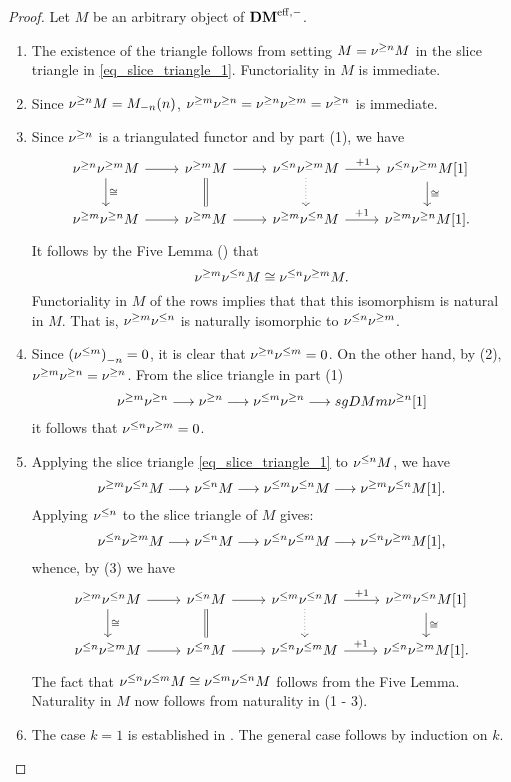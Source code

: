 \begin{proof}
Let $M$ be an arbitrary object of $\DMeff$.

\begin{enumerate}
\item The existence of the triangle follows from setting $M = 
\sgDM{n} M$ in the slice triangle in \eqref{eq_slice_triangle_1}. 
Functoriality in $M$ is immediate.

\item Since $\sgDM{n}M = \tZ[n]{\hZ[n]{M}}$, $\sgDM{m}\sgDM{n} = 
\sgDM{n}\sgDM{m} = \sgDM{n}$ is immediate.

\item Since $\sgDM{n}$ is a triangulated functor and by part (1),
we have
\[
\begin{tikzcd}
\sgDM{n} \sgDM{m} M \arrow{r} \arrow{d}{\cong} &
\sgDM{m} M \arrow{r} \arrow[equals]{d} &
\slDM{n} \sgDM{m} M \arrow{r}{+1} \arrow[dotted]{d} &
\slDM{n} \sgDM{m} M[1] \arrow{d}{\cong}\\
\sgDM{m} \sgDM{n} M \arrow{r} &
\sgDM{m} M \arrow{r} &
\sgDM{m} \slDM{n} M \arrow{r}{+1} &
\sgDM{m} \sgDM{n} M[1].
\end{tikzcd}
\]
It follows by the Five Lemma (\cite[10.2.2]{WH}) that 
\[
\sgDM{m}\slDM{n} M \cong \slDM{n}\sgDM{m} M.
\]
Functoriality in $M$ of the rows implies that that this 
isomorphism is natural in $M$. That is, $\sgDM{m} \slDM{n}$ is 
naturally isomorphic to $\slDM{n} \sgDM{m}$.

\item Since $\hZ[n]{(\slDM{m})} = 0$, it is clear that
$\sgDM{n}\slDM{m} = 0$. On the other hand, by (2), $\sgDM{m}\sgDM{n}
= \sgDM{n}$. From the slice triangle in part (1)
\[
\sgDM{m} \sgDM{n} \to \sgDM{n} \to \slDM{m} \sgDM{n} \to sgDM{m} 
   \sgDM{n}[1]
\]
it follows that $\slDM{n} \sgDM{m} = 0$.

\item Applying the slice triangle \eqref{eq_slice_triangle_1} to
$\slDM{n} M$, we have
\[
\sgDM{m} \slDM{n} M \to \slDM{n} M \to \slDM{m} \slDM{n} M \to
\sgDM{m} \slDM{n} M[1].
\]
Applying $\slDM{n}$ to the slice triangle of $M$ gives:
\[
\slDM{n} \sgDM{m} M \to \slDM{n} M \to \slDM{n} \slDM{m} M \to
\slDM{n} \sgDM{m} M[1],
\]
whence, by (3) we have
\[
\begin{tikzcd}
\sgDM{m} \slDM{n} M \arrow{r} \arrow{d}{\cong} &
\slDM{n} M \arrow{r} \arrow[equals]{d} &
\slDM{m} \slDM{n} M \arrow{r}{+1} \arrow[dotted]{d} &
\sgDM{m} \slDM{n} M[1] \arrow{d}{\cong}\\
\slDM{n} \sgDM{m} M \arrow{r} &
\slDM{n} M \arrow{r} &
\slDM{n} \slDM{m} M \arrow{r}{+1} &
\slDM{n} \sgDM{m} M[1].
\end{tikzcd}
\]
The fact that $\slDM{n} \slDM{m} M \cong \slDM{m} \slDM{n} M$
follows from the Five Lemma. Naturality in $M$ now follows from
naturality in (1 - 3).

\item The case $k = 1$ is established in \cite[Cor. 1.4]{HuKa}.
The general case follows by induction on $k$.

\end{enumerate}
\end{proof}

